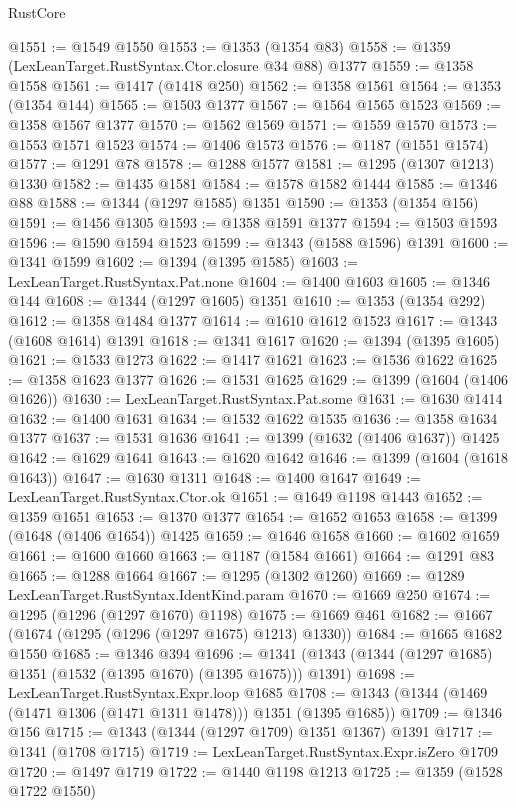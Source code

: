 \begin{lexlean}{RustCore}
\begin{coremodule}
@1551 := @1549 @1550
@1553 := @1353 (@1354 @83)
@1558 := @1359 (LexLeanTarget.RustSyntax.Ctor.closure @34 @88) @1377
@1559 := @1358 @1558
@1561 := @1417 (@1418 @250)
@1562 := @1358 @1561
@1564 := @1353 (@1354 @144)
@1565 := @1503 @1377
@1567 := @1564 @1565 @1523
@1569 := @1358 @1567 @1377
@1570 := @1562 @1569
@1571 := @1559 @1570
@1573 := @1553 @1571 @1523
@1574 := @1406 @1573
@1576 := @1187 (@1551 @1574)
@1577 := @1291 @78
@1578 := @1288 @1577
@1581 := @1295 (@1307 @1213) @1330
@1582 := @1435 @1581
@1584 := @1578 @1582 @1444
@1585 := @1346 @88
@1588 := @1344 (@1297 @1585) @1351
@1590 := @1353 (@1354 @156)
@1591 := @1456 @1305
@1593 := @1358 @1591 @1377
@1594 := @1503 @1593
@1596 := @1590 @1594 @1523
@1599 := @1343 (@1588 @1596) @1391
@1600 := @1341 @1599
@1602 := @1394 (@1395 @1585)
@1603 := LexLeanTarget.RustSyntax.Pat.none
@1604 := @1400 @1603
@1605 := @1346 @144
@1608 := @1344 (@1297 @1605) @1351
@1610 := @1353 (@1354 @292)
@1612 := @1358 @1484 @1377
@1614 := @1610 @1612 @1523
@1617 := @1343 (@1608 @1614) @1391
@1618 := @1341 @1617
@1620 := @1394 (@1395 @1605)
@1621 := @1533 @1273
@1622 := @1417 @1621
@1623 := @1536 @1622
@1625 := @1358 @1623 @1377
@1626 := @1531 @1625
@1629 := @1399 (@1604 (@1406 @1626))
@1630 := LexLeanTarget.RustSyntax.Pat.some
@1631 := @1630 @1414
@1632 := @1400 @1631
@1634 := @1532 @1622 @1535
@1636 := @1358 @1634 @1377
@1637 := @1531 @1636
@1641 := @1399 (@1632 (@1406 @1637)) @1425
@1642 := @1629 @1641
@1643 := @1620 @1642
@1646 := @1399 (@1604 (@1618 @1643))
@1647 := @1630 @1311
@1648 := @1400 @1647
@1649 := LexLeanTarget.RustSyntax.Ctor.ok
@1651 := @1649 @1198 @1443
@1652 := @1359 @1651
@1653 := @1370 @1377
@1654 := @1652 @1653
@1658 := @1399 (@1648 (@1406 @1654)) @1425
@1659 := @1646 @1658
@1660 := @1602 @1659
@1661 := @1600 @1660
@1663 := @1187 (@1584 @1661)
@1664 := @1291 @83
@1665 := @1288 @1664
@1667 := @1295 (@1302 @1260)
@1669 := @1289 LexLeanTarget.RustSyntax.IdentKind.param
@1670 := @1669 @250
@1674 := @1295 (@1296 (@1297 @1670) @1198)
@1675 := @1669 @461
@1682 := @1667 (@1674 (@1295 (@1296 (@1297 @1675) @1213) @1330))
@1684 := @1665 @1682 @1550
@1685 := @1346 @394
@1696 := @1341 (@1343 (@1344 (@1297 @1685) @1351 (@1532 (@1395 @1670) (@1395 @1675))) @1391)
@1698 := LexLeanTarget.RustSyntax.Expr.loop @1685
@1708 := @1343 (@1344 (@1469 (@1471 @1306 (@1471 @1311 @1478))) @1351 (@1395 @1685))
@1709 := @1346 @156
@1715 := @1343 (@1344 (@1297 @1709) @1351 @1367) @1391
@1717 := @1341 (@1708 @1715)
@1719 := LexLeanTarget.RustSyntax.Expr.isZero @1709
@1720 := @1497 @1719
@1722 := @1440 @1198 @1213
@1725 := @1359 (@1528 @1722 @1550)

\end{coremodule}
\end{lexlean}
